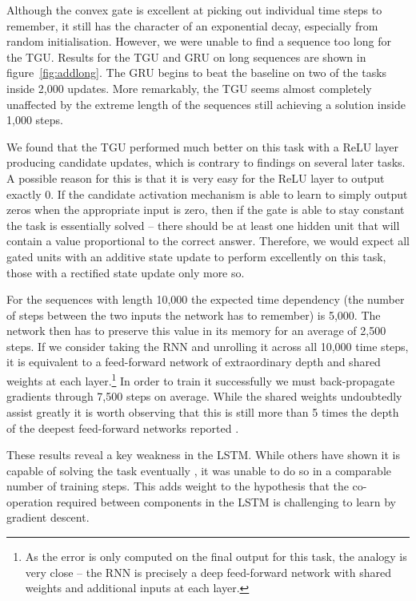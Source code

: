 Although the convex gate is excellent at picking out individual time steps to remember, it still
has the character of an exponential decay, especially from random initialisation. However, 
we were unable to find a sequence too long for the TGU. 
Results for the TGU and GRU on long sequences are shown in 
figure~\ref{fig:addlong}. The GRU begins to beat the baseline on two of the
tasks inside 2,000 updates. More remarkably, the TGU seems almost completely unaffected by the
extreme length of the sequences still achieving a solution inside 1,000 steps.

We found that the TGU performed much better on this task with a ReLU layer producing candidate updates,
which is contrary to findings on several later tasks.
A possible reason for this is that it is very easy for the ReLU layer to output exactly \(0\).
If the candidate activation mechanism is able to learn to simply output zeros when the appropriate
input is zero, then if the gate is able to stay constant the task is essentially solved -- there should
be at least one hidden unit that will contain a value proportional to the correct answer. Therefore,
we would expect all gated units with an additive state update to perform excellently on this task, those
with a rectified state update only more so.

For the sequences with length 10,000 the expected time dependency (the number of steps between the
two inputs the network has to remember) is 5,000. The network then has to preserve this value in its
memory for an average of 2,500 steps. If we consider taking the RNN and unrolling it across all 10,000
time steps, it is equivalent to a feed-forward network of extraordinary depth and shared weights at each
layer.\footnote{As the error is only computed on the final output for this task, the analogy is very
close -- the RNN is precisely a deep feed-forward network with shared weights and additional inputs
at each layer.} In order to train it successfully we must back-propagate gradients through
7,500 steps on average. While the shared weights undoubtedly assist greatly it is worth observing that this
is still more than 5 times the depth of the deepest feed-forward networks reported
\autocite{Huang2016}.

These results reveal a key weakness in the LSTM. While others have shown 
it is capable of solving the task eventually \autocite{Henaff2016}, it was unable to do so in a comparable
number of training steps.
This adds weight to the hypothesis that the co-operation required between components in the LSTM 
is challenging to learn by gradient descent.


